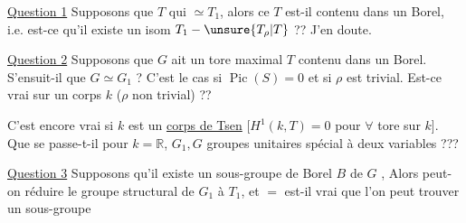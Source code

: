 \uline{Question 1} Supposons que  $T$ qui  $\simeq T_1$, alors ce $T$ est-il contenu dans un Borel, i.e. est-ce qu'il existe un isom  $T_1-\unsure{T_\rho|T}$ ??
J'en doute.

\uline{Question 2} Supposons que  $G$ ait un  tore maximal $T$ contenu dans un Borel. S'ensuit-il que $G\simeq G_1$ ?   C'est le cas si $\operatorname{Pic}(S)=0$  et si $\rho$  est trivial. Est-ce vrai sur un corps $k$ ($\rho$ non trivial) ??


 C'est encore vrai si $k$ est un \uline{corps de Tsen}
[$H^1(k,T)=0$ pour \uline{$\forall$} tore sur $k$]. Que se passe-t-il pour $k=\mathbb R$,  $G_1,G$ groupes  unitaires spécial à deux variables ???


\deleted{\unsure{\S}}
\uline{Question 3} Supposons qu'il existe un sous-groupe de Borel $B$ de $G$ , Alors peut-on réduire le groupe structural  de $G_1$ à $T_1$, et $=$ est-il vrai que  l'on peut trouver un sous-groupe
